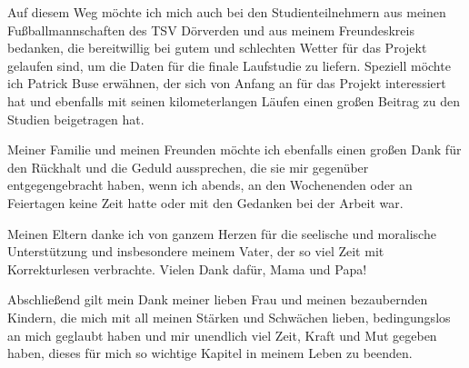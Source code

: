 Auf diesem Weg möchte ich mich auch bei den Studienteilnehmern aus meinen Fußballmannschaften des TSV Dörverden und aus meinem Freundeskreis bedanken, die bereitwillig bei gutem und schlechten Wetter für das Projekt gelaufen sind, um die Daten für die finale Laufstudie zu liefern. Speziell möchte ich Patrick Buse erwähnen, der sich von Anfang an für das Projekt interessiert hat und ebenfalls mit seinen kilometerlangen Läufen einen großen Beitrag zu den Studien beigetragen hat.

Meiner Familie und meinen Freunden möchte ich ebenfalls einen großen Dank für den Rückhalt und die Geduld aussprechen, die sie mir gegenüber entgegengebracht haben, wenn ich abends, an den Wochenenden oder an Feiertagen keine Zeit hatte oder mit den Gedanken bei der Arbeit war. 

Meinen Eltern danke ich von ganzem Herzen für die seelische und moralische Unterstützung und insbesondere meinem Vater, der so viel Zeit mit Korrekturlesen verbrachte. Vielen Dank dafür, Mama und Papa! 

Abschließend gilt mein Dank meiner lieben Frau und meinen bezaubernden Kindern, die mich mit all meinen Stärken und Schwächen lieben, bedingungslos an mich geglaubt haben und mir unendlich viel Zeit, Kraft und Mut gegeben haben, dieses für mich so wichtige Kapitel in meinem Leben zu beenden. 